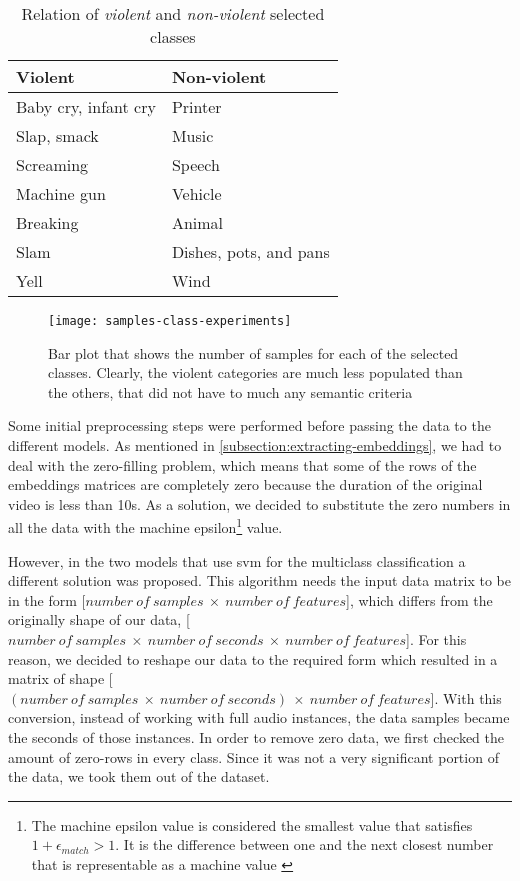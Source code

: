 	\begin{table}[ht]
		\centering
		\begin{tabular}{|| m{10em} | m{10em} ||}
			\hline
			\textbf{Violent} & \textbf{Non-violent} \\
			\hline\hline
			Baby cry, infant cry & Printer \\
			\hline
			Slap, smack & Music \\
			\hline
			Screaming & Speech \\
			\hline
			Machine gun & Vehicle \\
			\hline
			Breaking & Animal \\
			\hline
			Slam & Dishes, pots, and pans \\
			\hline
			Yell & Wind \\
			\hline
		\end{tabular}
	\caption{Relation of \textit{violent} and \textit{non-violent} selected classes}
	\label{table:7}
	\end{table}
	
	\begin{figure}[t]
		\centering
		\captionsetup{justification=centering}
		\texttt{[image: samples-class-experiments]}
		\caption{Bar plot that shows the number of samples for each of the selected classes. Clearly, the violent categories are much less populated than the others, that did not have to much any semantic criteria}
		\label{fig:mesh14}
	\end{figure}

	Some initial preprocessing steps were performed before passing the data to the different models. As mentioned in \ref{subsection:extracting-embeddings}, we had to deal with the zero-filling problem, which means that some of the rows of the embeddings matrices are completely zero because the duration of the original video is less than 10s. As a solution, we decided to substitute the zero numbers in all the data with the machine epsilon\footnote{The machine epsilon value is considered the smallest value that satisfies $1 + \epsilon_{match} > 1$. It is the difference between one and the next closest number that is representable as a machine value \cite{Kaw}} value. 
	
	However, in the two models that use \acrshort{svm} for the multiclass classification a different solution was proposed. This algorithm needs the input data matrix to be in the form [$number\ of\ samples\ \times\ number\ of\ features$], which differs from the originally shape of our data, [$number\ of\ samples\ \times\ number\ of\ seconds\ \times\ number\ of\ features$]. For this reason, we decided to reshape our data to the required form which resulted in a matrix of shape [$(number\ of\ samples\ \times\ number\ of\ seconds)\ \times\ number\ of\ features$]. With this conversion, instead of working with full audio instances, the data samples became the seconds of those instances. In order to remove zero data, we first checked the amount of zero-rows in every class. Since it was not a very significant portion of the data, we took them out of the dataset. 
	
